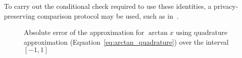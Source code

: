 To carry out the conditional check required to use these identities, a privacy-preserving comparison protocol may be used, such as in~\cite{veugen_improving_2012}.
\begin{figure}[!ht]
	\centering
	\caption{Absolute error of the approximation for $\arctan x$ using quadrature approximation (Equation~\ref{eq:arctan_quadrature}) over the interval $[-1,1]$}
	\label{fig:arctan_error_2}
\end{figure}
